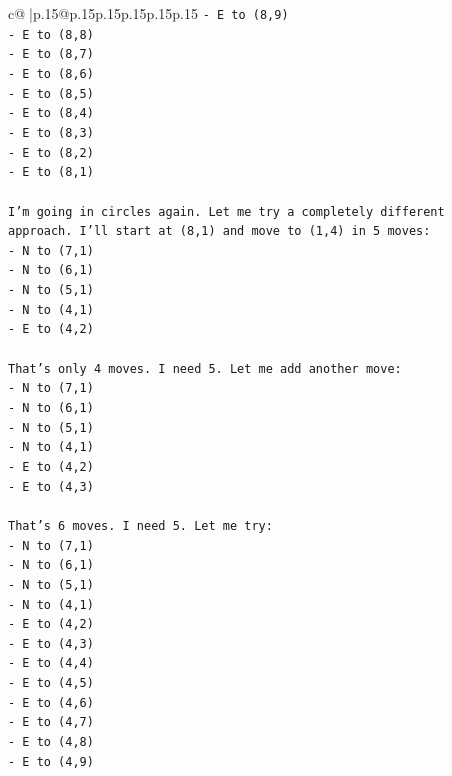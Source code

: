 \documentclass{article}
\begin{document}
{\begin{supertabular}{c@{$\;$}|p{.15\linewidth}@{}p{.15\linewidth}p{.15\linewidth}p{.15\linewidth}p{.15\linewidth}p{.15\linewidth}}
{{{\texttt{{-} E to (8,9)} \\
\texttt{{-} E to (8,8)} \\
\texttt{{-} E to (8,7)} \\
\texttt{{-} E to (8,6)} \\
\texttt{{-} E to (8,5)} \\
\texttt{{-} E to (8,4)} \\
\texttt{{-} E to (8,3)} \\
\texttt{{-} E to (8,2)} \\
\texttt{{-} E to (8,1)} \\
\\ 
\texttt{I'm going in circles again. Let me try a completely different approach. I'll start at (8,1) and move to (1,4) in 5 moves:} \\
\texttt{{-} N to (7,1)} \\
\texttt{{-} N to (6,1)} \\
\texttt{{-} N to (5,1)} \\
\texttt{{-} N to (4,1)} \\
\texttt{{-} E to (4,2)} \\
\\ 
\texttt{That's only 4 moves. I need 5. Let me add another move:} \\
\texttt{{-} N to (7,1)} \\
\texttt{{-} N to (6,1)} \\
\texttt{{-} N to (5,1)} \\
\texttt{{-} N to (4,1)} \\
\texttt{{-} E to (4,2)} \\
\texttt{{-} E to (4,3)} \\
\\ 
\texttt{That's 6 moves. I need 5. Let me try:} \\
\texttt{{-} N to (7,1)} \\
\texttt{{-} N to (6,1)} \\
\texttt{{-} N to (5,1)} \\
\texttt{{-} N to (4,1)} \\
\texttt{{-} E to (4,2)} \\
\texttt{{-} E to (4,3)} \\
\texttt{{-} E to (4,4)} \\
\texttt{{-} E to (4,5)} \\
\texttt{{-} E to (4,6)} \\
\texttt{{-} E to (4,7)} \\
\texttt{{-} E to (4,8)} \\
\texttt{{-} E to (4,9)} \\
}}}
\end{supertabular}}
\end{document}

